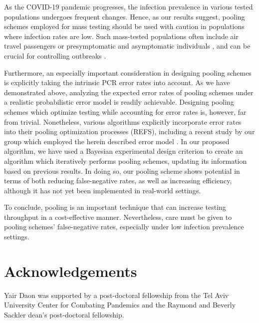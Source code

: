 \documentclass{article}
\begin{document}
As the COVID-19 pandemic progresses, the infection prevalence in
various tested populations undergoes frequent changes. Hence, as our
results suggest, pooling schemes employed for mass testing should be
used with caution in populations where infection rates are low. Such
mass-tested populations often include air travel passengers \cite{JTM}
or presymptomatic and asymptomatic individuals \cite{RobinHood}, and
can be crucial for controlling outbreaks \cite{MinaScience}.

Furthermore, an especially important
consideration in designing pooling schemes is explicitly taking the
intrinsic PCR error rates into account. As we have demonstrated above, analyzing the expected error rates of pooling schemes under a realistic probabilistic error model is readily achievable. Designing pooling schemes which optimize testing while accounting for error rates is, however, far from trivial. Nonetheless, various algorithms explicitly incorporate error rates into their pooling optimization processes (REFS), including a recent study by our group which employed the herein described error model \cite{DOPE}. 
In our proposed algorithm, we have used a Bayesian experimental design criterion to create an algorithm which iteratively performs pooling schemes, updating its information based on previous results. In doing so, our pooling
scheme shows potential in terms of both reducing false-negative rates, as well as increasing
efficiency, although it has not yet been implemented in real-world
settings.

To conclude, pooling is an important technique that can increase
testing throughput in a cost-effective manner. Nevertheless, care must
be given to pooling schemes' false-negative rates, especially under
low infection prevalence settings.

\section*{Acknowledgements}
Yair Daon was supported by a post-doctoral fellowship from the Tel
Aviv University Center for Combating Pandemics and the Raymond and
Beverly Sackler dean's post-doctoral fellowship.



\end{document}
